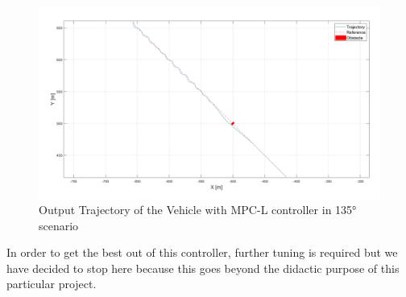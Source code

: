 \begin{figure}[H]
    \centering
    \includegraphics[width=\textwidth,keepaspectratio]{Figures/mpc_l_test_169.png}
    \caption{Output Trajectory of the Vehicle with MPC-L controller in 135° scenario}
    \label{fig:mpc_l_test}
    \end{figure}
    
   
In order to get the best out of this controller, further tuning is required but we have decided to stop here because this goes beyond the didactic purpose of this particular project. 